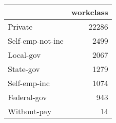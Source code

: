 \begin{tabular}{lr}
\toprule
{} &  workclass \\
\midrule
 Private          &      22286 \\
 Self-emp-not-inc &       2499 \\
 Local-gov        &       2067 \\
 State-gov        &       1279 \\
 Self-emp-inc     &       1074 \\
 Federal-gov      &        943 \\
 Without-pay      &         14 \\
\bottomrule
\end{tabular}
